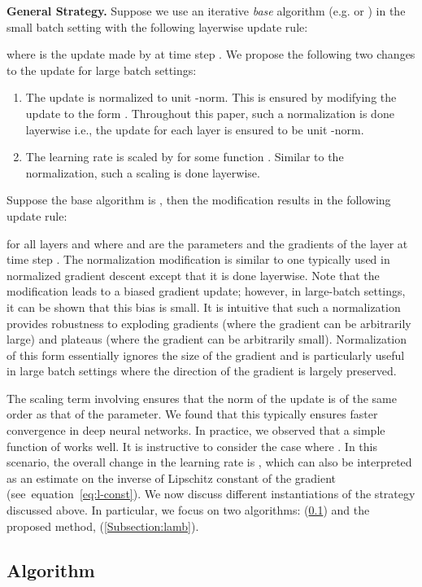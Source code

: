 \documentclass{article} \usepackage{iclr2020_conference,times}
\def\eqref#1{equation~\ref{#1}}
\begin{document}
{\bf General Strategy.} Suppose we use an iterative \emph{base} algorithm  (e.g.  or ) in the small batch setting with the following layerwise update rule:
 
where  is the update made by  at time step . We propose the following two changes to the update for large batch settings:
\begin{enumerate}
\item The update is normalized to unit -norm. This is ensured by modifying the update to the form . Throughout this paper, such a normalization is done layerwise i.e., the update for each layer is ensured to be unit -norm.
\item The learning rate is scaled by  for some function . Similar to the normalization, such a scaling is done layerwise.
\end{enumerate}
Suppose the base algorithm  is , then the modification results in the following update rule:

for all layers  and where  and  are the parameters and the gradients of the  layer at time step .  The normalization modification is similar to one typically used in normalized gradient descent except that it is done layerwise. Note that the modification leads to a biased gradient update; however, in large-batch settings, it can be shown that this bias is small.  It is intuitive  that such a normalization provides robustness to exploding gradients (where the gradient can be arbitrarily large) and plateaus (where the gradient can be arbitrarily small). Normalization of this form essentially ignores the size of the gradient and is particularly useful in large batch settings where the direction of the gradient is largely preserved.

The scaling term involving  ensures that the norm of the update is of the same order as that of the parameter. We found that this typically ensures faster convergence in deep neural networks. In practice, we observed that a simple function of  works well. It is instructive to consider the case where . In this scenario, the overall change in the learning rate is  , which can also be interpreted as an estimate on the inverse of Lipschitz constant of the gradient (see~\eqref{eq:l-const}). We now discuss different instantiations of the strategy discussed above. 
In particular, we focus on two algorithms:  (\ref{Subsection:lars}) and the proposed method,  (\ref{Subsection:lamb}).

\subsection{ Algorithm}
\label{Subsection:lars}
\end{document}
